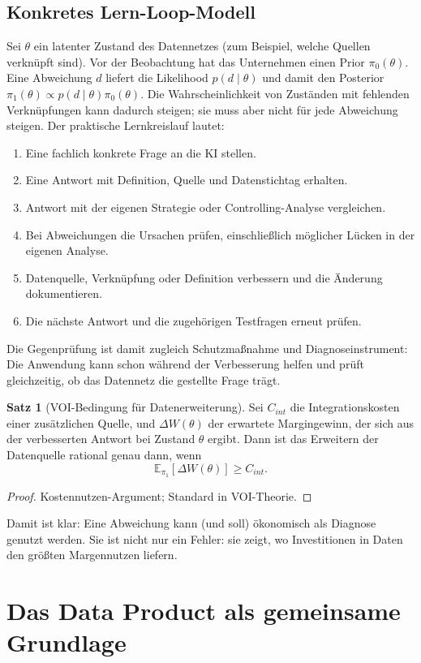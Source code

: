 \documentclass[a4paper,12pt,twoside]{report}
\theoremstyle{definition}
\newtheorem{satz}[definition]{Satz}
\newcommand{\E}{\mathbb{E}}
\begin{document}
\section{Konkretes Lern-Loop-Modell}
Sei $\theta$ ein latenter Zustand des Datennetzes (zum Beispiel, welche Quellen verknüpft sind). Vor der Beobachtung hat das Unternehmen einen Prior $\pi_0(\theta)$. Eine Abweichung $d$ liefert die Likelihood $p(d\mid\theta)$ und damit den Posterior $\pi_1(\theta)\propto p(d\mid\theta)\pi_0(\theta)$. Die Wahrscheinlichkeit von Zuständen mit fehlenden Verknüpfungen kann dadurch steigen; sie muss aber nicht für jede Abweichung steigen. Der praktische Lernkreislauf lautet:
\begin{enumerate}
\item Eine fachlich konkrete Frage an die KI stellen.
\item Eine Antwort mit Definition, Quelle und Datenstichtag erhalten.
\item Antwort mit der eigenen Strategie oder Controlling-Analyse vergleichen.
\item Bei Abweichungen die Ursachen prüfen, einschließlich möglicher Lücken in der eigenen Analyse.
\item Datenquelle, Verknüpfung oder Definition verbessern und die Änderung dokumentieren.
\item Die nächste Antwort und die zugehörigen Testfragen erneut prüfen.
\end{enumerate}
Die Gegenprüfung ist damit zugleich Schutzmaßnahme und Diagnoseinstrument: Die Anwendung kann schon während der Verbesserung helfen und prüft gleichzeitig, ob das Datennetz die gestellte Frage trägt.

\begin{satz}[VOI-Bedingung für Datenerweiterung]
Sei $C_{int}$ die Integrationskosten einer zusätzlichen Quelle, und $\Delta W(\theta)$ der erwartete Margingewinn, der sich aus der verbesserten Antwort bei Zustand $\theta$ ergibt. Dann ist das Erweitern der Datenquelle rational genau dann, wenn
\[
\E_{\pi_1}[\Delta W(\theta)] \ge C_{int}.
\]
\end{satz}
\begin{proof}
Kostennutzen-Argument; Standard in VOI-Theorie.
\end{proof}

Damit ist klar: Eine Abweichung kann (und soll) ökonomisch als Diagnose genutzt werden. Sie ist nicht nur ein Fehler: sie zeigt, wo Investitionen in Daten den größten Margennutzen liefern.

\chapter{Das Data Product als gemeinsame Grundlage}
\label{sec:data-product}
\end{document}
